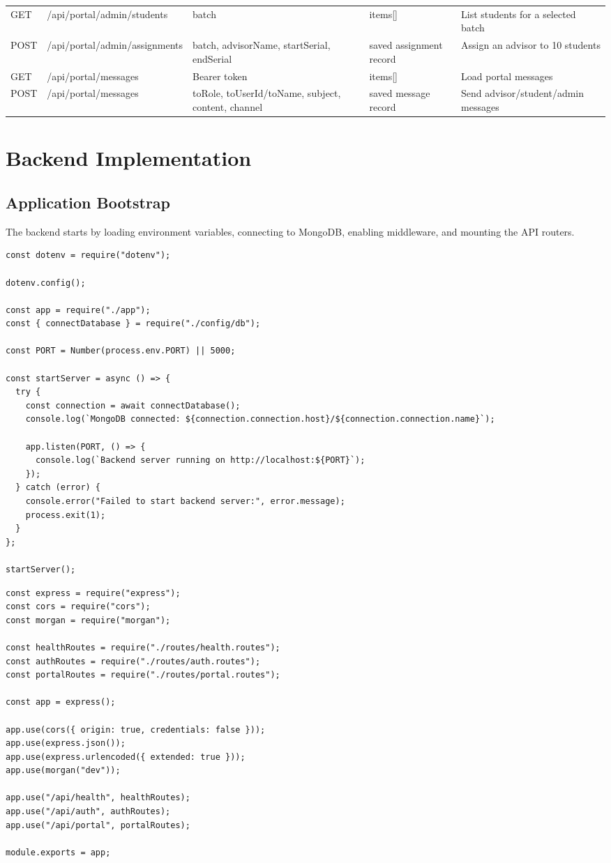\documentclass[12pt,a4paper]{article}
\begin{document}
\begin{longtable}{L{1.6cm}L{3.2cm}L{3.4cm}L{5.0cm}L{2.2cm}}
GET & /api/portal/admin/students & batch & items[] & List students for a selected batch \\
POST & /api/portal/admin/assignments & batch, advisorName, startSerial, endSerial & saved assignment record & Assign an advisor to 10 students \\
GET & /api/portal/messages & Bearer token & items[] & Load portal messages \\
POST & /api/portal/messages & toRole, toUserId/toName, subject, content, channel & saved message record & Send advisor/student/admin messages \\
\bottomrule
\end{longtable}
\normalsize

\section{Backend Implementation}
\subsection{Application Bootstrap}
The backend starts by loading environment variables, connecting to MongoDB, enabling middleware, and mounting the API routers.

\begin{lstlisting}
const dotenv = require("dotenv");

dotenv.config();

const app = require("./app");
const { connectDatabase } = require("./config/db");

const PORT = Number(process.env.PORT) || 5000;

const startServer = async () => {
  try {
    const connection = await connectDatabase();
    console.log(`MongoDB connected: ${connection.connection.host}/${connection.connection.name}`);

    app.listen(PORT, () => {
      console.log(`Backend server running on http://localhost:${PORT}`);
    });
  } catch (error) {
    console.error("Failed to start backend server:", error.message);
    process.exit(1);
  }
};

startServer();
\end{lstlisting}

\begin{lstlisting}
const express = require("express");
const cors = require("cors");
const morgan = require("morgan");

const healthRoutes = require("./routes/health.routes");
const authRoutes = require("./routes/auth.routes");
const portalRoutes = require("./routes/portal.routes");

const app = express();

app.use(cors({ origin: true, credentials: false }));
app.use(express.json());
app.use(express.urlencoded({ extended: true }));
app.use(morgan("dev"));

app.use("/api/health", healthRoutes);
app.use("/api/auth", authRoutes);
app.use("/api/portal", portalRoutes);

module.exports = app;
\end{lstlisting}
\end{document}
